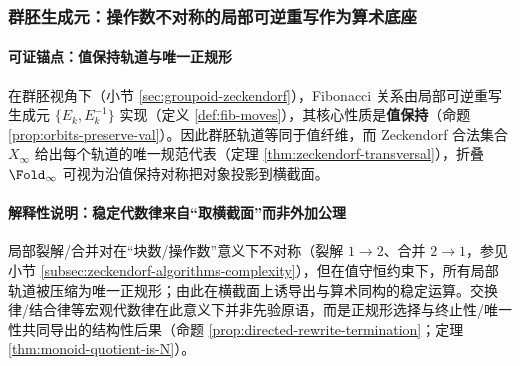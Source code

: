 













\subsubsection{群胚生成元：操作数不对称的局部可逆重写作为算术底座}\label{subsubsec:insight-groupoid-generators}
\paragraph{可证锚点：值保持轨道与唯一正规形}
在群胚视角下（小节 \ref{sec:groupoid-zeckendorf}），Fibonacci 关系由局部可逆重写生成元 \(\{E_k,E_k^{-1}\}\) 实现（定义 \ref{def:fib-moves}），其核心性质是\textbf{值保持}（命题 \ref{prop:orbits-preserve-val}）。因此群胚轨道等同于值纤维，而 Zeckendorf 合法集合 \(X_\infty\) 给出每个轨道的唯一规范代表（定理 \ref{thm:zeckendorf-transversal}），折叠 \(\Fold_\infty\) 可视为沿值保持对称把对象投影到横截面。

\paragraph{解释性说明：稳定代数律来自“取横截面”而非外加公理}
局部裂解/合并对在“块数/操作数”意义下不对称（裂解 \(1\to 2\)、合并 \(2\to 1\)，参见小节 \ref{subsec:zeckendorf-algorithms-complexity}），但在值守恒约束下，所有局部轨道被压缩为唯一正规形；由此在横截面上诱导出与算术同构的稳定运算。交换律/结合律等宏观代数律在此意义下并非先验原语，而是正规形选择与终止性/唯一性共同导出的结构性后果（命题 \ref{prop:directed-rewrite-termination}；定理 \ref{thm:monoid-quotient-is-N}）。

